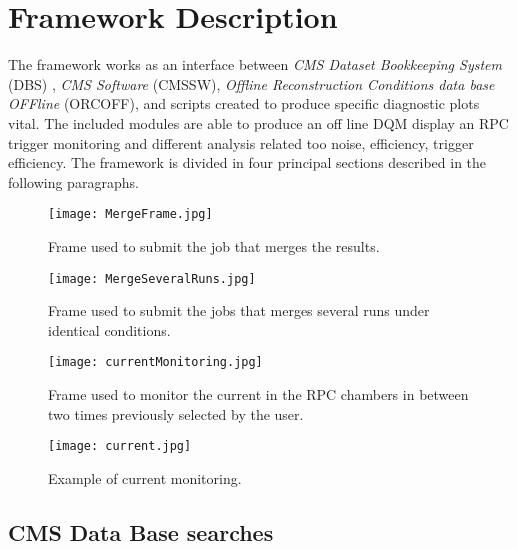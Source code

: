 \documentclass[11pt]{amsart}
\begin{document}
\section{Framework Description}
The framework works as an interface between \textit{CMS Dataset Bookkeeping System} (DBS)\cite{DBS} , \textit{CMS Software} (CMSSW), \textit{Offline Reconstruction Conditions data base OFFline} (ORCOFF)\cite{ORCOF}, and scripts created to produce specific diagnostic plots vital. The included modules are able to produce an off line DQM\cite{dqm} display an RPC trigger monitoring and different analysis related too noise, efficiency, trigger efficiency. The framework is divided in four principal sections described in the following paragraphs.\\
\begin{figure}[htb] %
   \centering
   \texttt{[image: MergeFrame.jpg]} 
   \caption{Frame used to submit the job that merges the results.}
   \label{fig:mergeframe}
\end{figure}
\begin{figure}[htb] %
   \centering
   \texttt{[image: MergeSeveralRuns.jpg]} 
   \caption{Frame used to submit the jobs that merges several runs under identical conditions.}
   \label{fig:mergeseveral}
\end{figure}
\begin{figure}[htb] %
   \centering
   \texttt{[image: currentMonitoring.jpg]} 
   \caption{Frame used to monitor the current in the RPC chambers in between two times previously selected by the user.}
   \label{fig:currentmonitoring}
\end{figure}
\begin{figure}[htb] %
   \centering
   \texttt{[image: current.jpg]} 
   \caption{Example of current monitoring.}
   \label{fig:currentmonitoring}
\end{figure}
\subsection{CMS Data Base searches}
\end{document}
